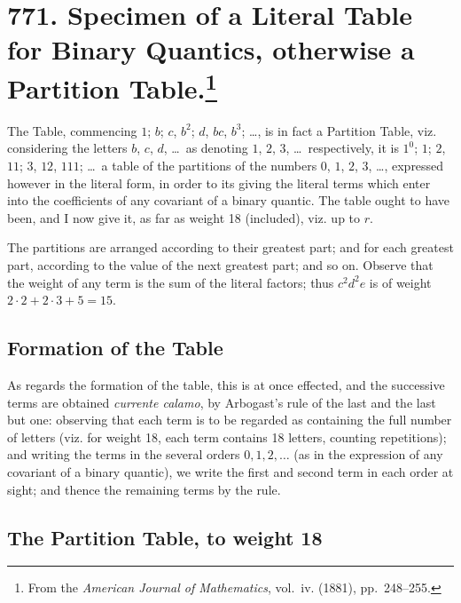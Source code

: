 \documentclass[11pt,a4paper]{book}
\begin{document}
\newpage
\section[Specimen of a Literal Table for Binary Quantics, otherwise a Partition Table]{771. Specimen of a Literal Table for Binary Quantics, otherwise a Partition Table.\footnote{From the \textit{American Journal of Mathematics}, vol.~iv. (1881), pp.~248--255.}}

The Table, commencing $1$; $b$; $c$, $b^2$; $d$, $bc$, $b^3$; \dots, is in fact a Partition Table, viz. considering the letters $b$, $c$, $d$, \dots\ as denoting $1$, $2$, $3$, \dots\ respectively, it is $1^0$; $1$; $2$, $11$; $3$, $12$, $111$; \dots\ a table of the partitions of the numbers $0$, $1$, $2$, $3$, \dots, expressed however in the literal form, in order to its giving the literal terms which enter into the coefficients of any covariant of a binary quantic. The table ought to have been, and I now give it, as far as weight 18 (included), viz. up to $r$.

The partitions are arranged according to their greatest part; and for each greatest part, according to the value of the next greatest part; and so on. Observe that the weight of any term is the sum of the literal factors; thus $c^2d^2e$ is of weight $2\cdot 2 + 2\cdot 3 + 5 = 15$.

\subsection*{Formation of the Table}

As regards the formation of the table, this is at once effected, and the successive terms are obtained \textit{currente calamo}, by Arbogast's rule of the last and the last but one: observing that each term is to be regarded as containing the full number of letters (viz. for weight 18, each term contains 18 letters, counting repetitions); and writing the terms in the several orders $0, 1, 2, \dots$ (as in the expression of any covariant of a binary quantic), we write the first and second term in each order at sight; and thence the remaining terms by the rule.

\subsection*{The Partition Table, to weight 18}
\end{document}
